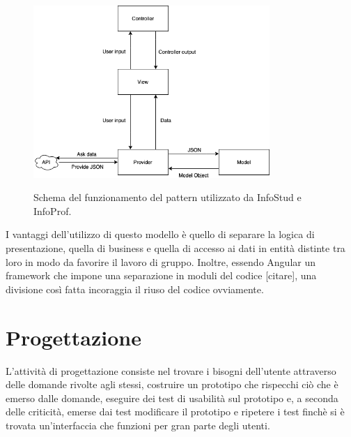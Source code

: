 \documentclass[Lau, oneside]{sapthesis}%
\begin{document}
\begin{figure}[ht]
	\caption{Schema del funzionamento del pattern utilizzato da InfoStud e InfoProf.}
	\centering
	\includegraphics[width=0.8\textwidth]{arch-pattern-img}
	\label{fig:pattern}
\end{figure}

I vantaggi dell'utilizzo di questo modello è quello di separare la logica di presentazione, quella di business e quella di accesso ai dati
in entità distinte tra loro in modo da favorire il lavoro di gruppo. Inoltre, essendo Angular un framework che impone una separazione in moduli del codice [citare], una divisione
così fatta incoraggia il riuso del codice ovviamente. %



\chapter{Progettazione}
\label{ch:3}
L'attività di progettazione consiste nel trovare i bisogni dell'utente attraverso delle domande rivolte agli stessi, costruire un prototipo che rispecchi ciò che è emerso dalle domande, eseguire dei test di usabilità sul prototipo e, a seconda delle criticità, emerse dai test modificare il prototipo e ripetere i test finchè si è trovata un'interfaccia che funzioni per gran parte degli utenti.
\end{document}
